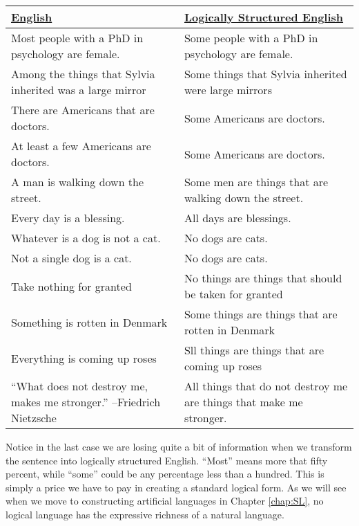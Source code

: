 \begin{longtabu}{p{.5\linewidth}p{.5\linewidth}}
\underline{English} &
\underline{Logically Structured English} \\
\endhead 

Most people with a PhD in psychology are female. &
Some people with a PhD in psychology are female. \\

Among the things that Sylvia inherited was a large mirror &
Some things that Sylvia inherited were large mirrors\\

There are Americans that are doctors. &
Some Americans are doctors. \\

At least a few Americans are doctors.&
Some Americans are doctors. \\

A man is walking down the street. &
Some men are things that are walking down the street.\\


Every day is a blessing. &
All days are blessings. \\

Whatever is a dog is not a cat. &
No dogs are cats. \\

Not a single dog is a cat. &
No dogs are cats. \\

Take nothing for granted &
No things are things that should be taken for granted \\

Something is rotten in Denmark &
Some things are things that are rotten in Denmark\\

Everything is coming up roses & 
Sll things are things that are coming up roses\\


``What does not destroy me, makes me stronger.'' --Friedrich Nietzsche & 
All things that do not destroy me are things that make me stronger. \\


\end{longtabu}

Notice in the last case we are losing quite a bit of information when we transform the sentence into logically structured English. ``Most'' means more that fifty percent, while ``some'' could be any percentage less than a hundred. This is simply a price we have to pay in creating a standard logical form. As we will see when we move to constructing artificial languages in Chapter \ref{chap:SL}, no logical language has the expressive richness of a natural language. 

